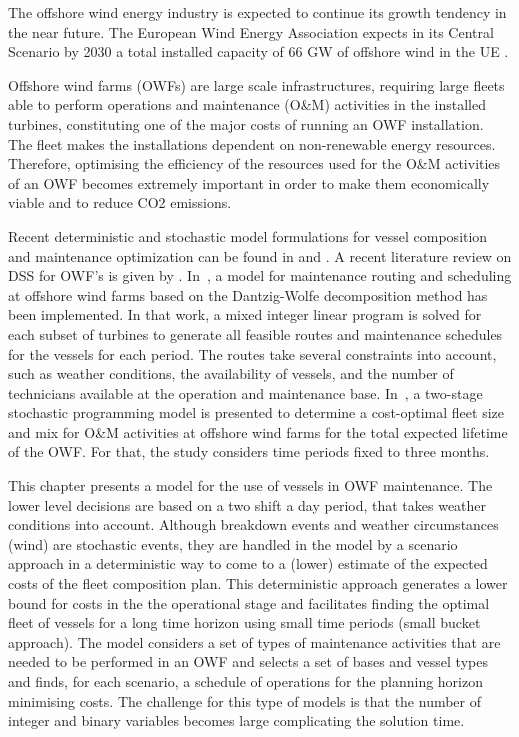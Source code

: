The offshore wind energy industry is expected to continue its growth tendency in the near future. The European Wind Energy Association expects in its Central Scenario by 2030 a total installed capacity of 66 GW of offshore wind in the UE \cite{WES2030}.


Offshore wind farms (OWFs) are large scale infrastructures, requiring large fleets able to perform operations and maintenance (O\&M) activities in the installed turbines, constituting one of the major costs of running an OWF installation. The fleet makes the installations  dependent on non-renewable energy resources. Therefore, optimising the efficiency of the resources used for the O\&M activities of an OWF becomes extremely important in order to make them economically viable and to reduce CO2 emissions.



Recent deterministic and stochastic model formulations for vessel composition and maintenance optimization  can be found in \cite{Gundegjerde2015} and \cite{HALVORSENWEARE2013}. A recent literature review on DSS for OWF's is given by \cite{hofmannrev}.
%
In~\cite{EJOR2016}, a model for maintenance routing
and scheduling at offshore wind farms based on the Dantzig-Wolfe decomposition method has been implemented.
In that work, a mixed integer linear program is solved for each subset of turbines to generate all  feasible routes and maintenance schedules for the vessels for each period.
The routes take several constraints into account, such as weather conditions, the availability of vessels,
and the number of technicians available at the operation and maintenance base.
%
In~\cite{Stalhane2016357}, a two-stage stochastic programming model is presented to determine a cost-optimal fleet size and mix for
O\&M activities at offshore wind farms for the total expected lifetime of the OWF. For that, the study considers time periods fixed to three months.




This chapter presents a model for the use of vessels in OWF maintenance. The lower level decisions are based on a two shift a day period, that takes weather conditions into account. Although breakdown events and weather circumstances (wind) are stochastic events, they are handled in the model by a scenario approach in a deterministic way to come to a (lower) estimate of the expected costs of the fleet composition plan. This deterministic approach generates a lower bound for costs in the the operational stage and facilitates finding the optimal fleet of vessels for a long time horizon using small time periods (small bucket approach). The model considers a set of types of maintenance activities that are needed to be performed in an OWF and selects a set of bases and vessel types and finds, for each scenario, a schedule of operations for the planning horizon minimising costs. The challenge for this type of models is that the number of integer and binary variables becomes large complicating the solution time. 

